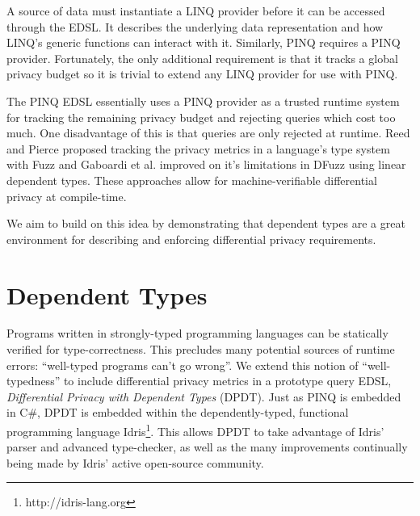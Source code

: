 \documentclass[12pt]{report}
\begin{document}
A source of data must instantiate a LINQ provider before it can be accessed through the EDSL.
It describes the underlying data representation and how LINQ's generic functions can interact with it.
Similarly, PINQ requires a PINQ provider.
Fortunately, the only additional requirement is that it tracks a global privacy budget so it is trivial to extend any LINQ provider for use with PINQ.

The PINQ EDSL essentially uses a PINQ provider as a trusted runtime system for tracking the remaining privacy budget and rejecting queries which cost too much.
One disadvantage of this is that queries are only rejected at runtime.
Reed and Pierce proposed tracking the privacy metrics in a language's type system with Fuzz\cite{conf/icfp/ReedP10} and Gaboardi et al. improved on it's limitations in DFuzz\cite{conf/popl/GaboardiHHNP13} using linear dependent types.
These approaches allow for machine-verifiable differential privacy at compile-time.

We aim to build on this idea by demonstrating that dependent types are a great environment for describing and enforcing differential privacy requirements.

\section{Dependent Types}\label{sec:intro-deptyps}


Programs written in strongly-typed programming languages can be statically verified for type-correctness.
This precludes many potential sources of runtime errors: ``well-typed programs can't go wrong''.
We extend this notion of ``well-typedness'' to include differential privacy metrics in a prototype query EDSL, \textit{Differential Privacy with Dependent Types} (DPDT).
Just as PINQ is embedded in C\#, DPDT is embedded within the dependently-typed, functional programming language Idris\footnote{http://idris-lang.org}.
This allows DPDT to take advantage of Idris' parser and advanced type-checker, as well as the many improvements continually being made by Idris' active open-source community.
\end{document}
